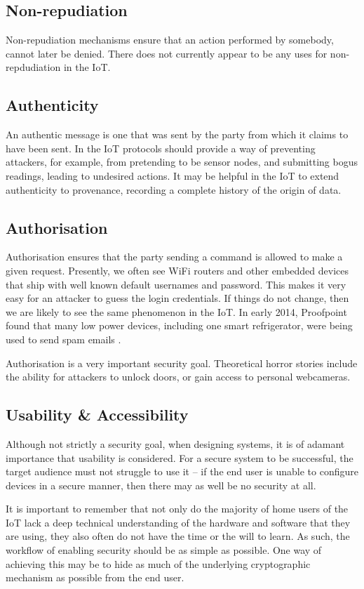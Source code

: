 \documentclass[10pt,journal,compsoc]{IEEEtran}
\begin{document}
\subsection{Non-repudiation}
Non-repudiation mechanisms ensure that an action performed by somebody, cannot
later be denied. There does not currently appear to be any uses for
non-repdudiation in the IoT. 

\subsection{Authenticity}
An authentic message is one that was sent by the party from which it claims to
have been sent. In the IoT protocols should provide a way of preventing
attackers, for example, from pretending to be sensor nodes, and submitting
bogus readings, leading to undesired actions. It may be helpful in the IoT to
extend authenticity to provenance, recording a complete history of the origin
of data.  

\subsection{Authorisation}
Authorisation ensures that the party sending a command is allowed
to make a given request. Presently, we often see WiFi routers
and other embedded devices that ship with well known default usernames
and password. This makes it very easy for an attacker to guess the login
credentials. If things do not change, then we are likely to see the same
phenomenon in the IoT. In early 2014, Proofpoint found that many low power
devices, including one smart refrigerator, were being used to send spam emails
\cite{Proofpoint2014}.

Authorisation is a very important security goal. Theoretical horror stories
include the ability for attackers to unlock doors, or gain access to personal
webcameras.  

\subsection{Usability \& Accessibility}
Although not strictly a security goal, when designing systems, it is of
adamant importance that usability is considered. For a secure system to be
successful, the target audience must not struggle to use it -- if the end
user is unable to configure devices in a secure manner, then there may as well
be no security at all.

It is important to remember that not only do the majority of home users of the
IoT lack a deep technical understanding of the hardware and software that they
are using, they also often do not have the time or the will to learn.  As such,
the workflow of enabling security should be as simple as possible. One way of
achieving this may be to hide as much of the underlying cryptographic mechanism
as possible from the end user.
\end{document}
